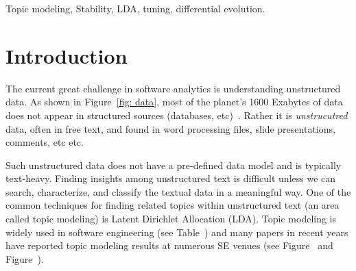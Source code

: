 \documentclass[10pt,conference]{IEEEtran}
\theoremstyle{break}
\begin{document}
\begin{IEEEkeywords}
Topic modeling, Stability, LDA, tuning, differential evolution.
\end{IEEEkeywords}

\section{Introduction}
\label{sect: intro}
The current great challenge in software analytics is understanding unstructured data. As shown in Figure~\ref{fig: data}, most of the planet's 1600 Exabytes of data does not appear in structured sources (databases, etc)~\cite{nadkarni2014structured}. Rather
it is {\em unstrucutred} data, often in free text, and found in word processing
files, slide presentations, comments, etc etc. 

Such unstructured data does not have a pre-defined data model and is typically text-heavy. Finding insights among unstructured text is  difficult unless we can search, characterize, and classify the textual data in a meaningful way. One of the common techniques for finding related topics within unstructured text (an area called topic modeling) is Latent Dirichlet Allocation (LDA).
Topic modeling is widely used in software engineering (see Table~\cite{tbl:survey})
and many papers in recent years have reported  topic modeling results at numerous SE venues (see Figure~\cite{fig:survey1} and
Figure~\cite{fig:survey2}).




\end{document}

